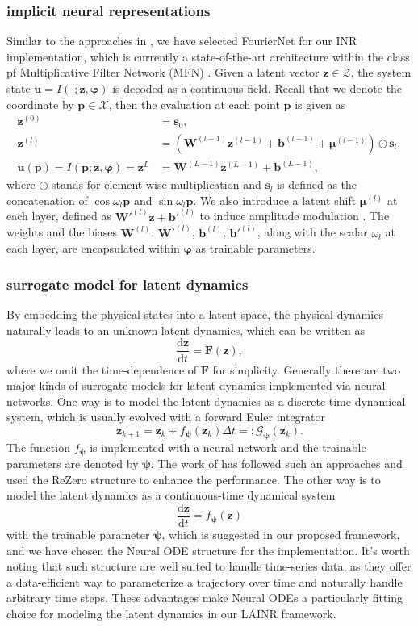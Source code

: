 \documentclass{article}
\newcommand{\md}{\mathrm{d}}
\newcommand{\mX}{\mathcal{X}}
\newcommand{\mZ}{\mathcal{Z}}
\newcommand{\mG}{\mathcal{G}}
\begin{document}
\subsubsection{implicit neural representations}
Similar to the approaches in \cite{yin2023dino}, we have selected FourierNet for our INR implementation, which is currently a state-of-the-art architecture within the class pf Multiplicative Filter Network (MFN) \cite{fathony2021multiplicative}. Given a latent vector $\bm z\in\mZ$, the system state $\bm u=I(\cdot;\bm z,\bm\varphi)$ is decoded as a continuous field. Recall that we denote the coordinate by $\bm p\in\mX$, then the evaluation at each point $\bm p$ is given as
\begin{align*}
	\bm z^{(0)}                                      & =\bm s_0,                                                                \\
	\bm z^{(l)}                                      & =(\bm W^{(l-1)}\bm z^{(l-1)}+\bm b^{(l-1)}+\bm \mu^{(l-1)})\odot\bm s_l, \\
	\bm u(\bm p)=I(\bm p;\bm z,\bm\varphi)=\bm z^{L} & =\bm W^{(L-1)}\bm z^{(L-1)}+\bm b^{(L-1)},
\end{align*}
where $\odot$ stands for element-wise multiplication and $\bm s_l$ is defined as the concatenation of $\cos\omega_l\bm p$ and $\sin\omega_l\bm p$. We also introduce a latent shift $\bm\mu^{(l)}$ at each layer, defined as $\bm W'^{(l)}\bm z+\bm b'^{(l)}$ to induce amplitude modulation \cite{dupont2022}. The weights and the biases $\bm W^{(l)}$, $\bm W'^{(l)}$, $\bm b^{(l)}$, $\bm b'^{(l)}$, along with the scalar $\omega_l$ at each layer, are encapsulated within $\bm\varphi$ as trainable parameters.
\subsubsection{surrogate model for latent dynamics}
By embedding the physical states into a latent space, the physical dynamics naturally leads to an unknown latent dynamics, which can be written as
\[\frac{\md \bm z}{\md t}=\bm F(\bm z),\]
where we omit the time-dependence of $\bm F$ for simplicity. Generally there are two major kinds of surrogate models for latent dynamics implemented via neural networks. One way is to model the latent dynamics as a discrete-time dynamical system, which is usually evolved with a forward Euler integrator
\[\bm z_{k+1}=\bm z_k+f_{\bm \psi}(\bm z_k)\Delta t=:\mG_{\bm \psi}(\bm z_k).\]
The function $f_{\bm\psi}$ is implemented with a neural network and the trainable parameters are denoted by $\bm\psi$. The work of \cite{Peyron2021LAwithAE} has followed such an approaches and used the ReZero\cite{bachlechner2021rezero} structure to enhance the performance. The other way is to model the latent dynamics as a continuous-time dynamical system
\[\frac{\md \bm z}{\md t}=f_{\bm\psi}(\bm z)\]
with the trainable parameter $\bm\psi$, which is suggested in our proposed framework, and we have chosen the Neural ODE structure for the implementation. It's worth noting that such structure are well suited to handle time-series data, as they offer a data-efficient way to parameterize a trajectory over time and naturally handle arbitrary time steps. These advantages make Neural ODEs a particularly fitting choice for modeling the latent dynamics in our LAINR framework.
\end{document}
